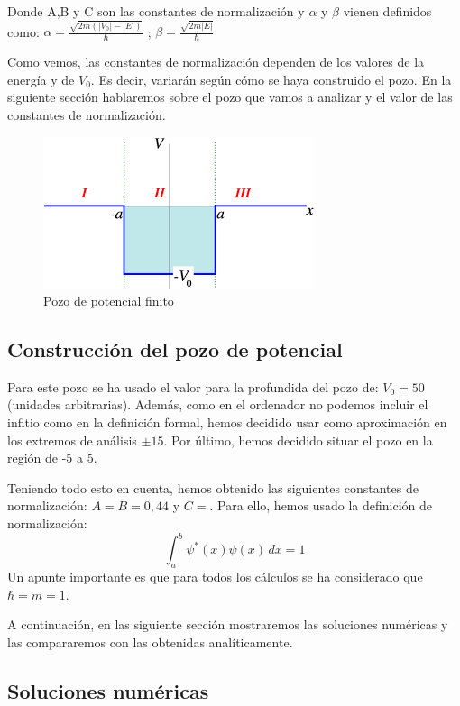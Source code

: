 \documentclass[12pt]{article}
\begin{document}
Donde A,B y C son las constantes de normalización y $\alpha$ y $\beta$ vienen definidos como: 
$\alpha=\frac{\sqrt{2m(\left\lvert V_0 \right\rvert-\left\lvert E \right\rvert)}}{\hbar}$
; $\beta=\frac{\sqrt{2m\left\lvert E \right\rvert}}{\hbar}$ \\
\par
Como vemos, las constantes de normalización dependen de los 
valores de la energía y de $V_0$. Es decir, variarán según cómo
se haya construido el pozo. En la siguiente sección hablaremos sobre
el pozo que vamos a analizar y el valor de las constantes de normalización.
\begin{figure}[h]
    \centering
    \includegraphics{images.png}
    \caption{Pozo de potencial finito}
    \label{fig:etiqueta}
\end{figure}
\subsection{Construcción del pozo de potencial}
Para este pozo se ha usado el valor para la profundida del pozo
de: $V_0=50$(unidades arbitrarias). Además, como en el ordenador
no podemos incluir el infitio como en la definición formal, hemos 
decidido usar como aproximación en los extremos de análisis $\pm 15$.
Por último, hemos decidido situar el pozo en la región de -5 a 5. \\
\par
Teniendo todo esto en cuenta, hemos obtenido las siguientes constantes
de normalización: $A=B=0,44$ y $C=$. Para ello, hemos usado la definición
de normalización:
\begin{equation}
\int_{a}^{b} \psi^{*}(x) \psi(x) \,dx=1
\end{equation}
Un apunte importante es que para todos los cálculos se ha considerado
que $\hbar=m=1$. \\
\par
A continuación, en las siguiente sección mostraremos las soluciones numéricas 
y las compararemos con las obtenidas analíticamente.
\subsection{Soluciones numéricas}
\end{document}

